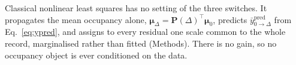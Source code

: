 \begin{appendixbox}
Classical nonlinear least squares has no setting of the three switches. It propagates the
mean occupancy alone, $\boldsymbol{\mu}_\Delta = \mathbf{P}(\Delta)^\top\boldsymbol{\mu}_0$, predicts
$\bar{y}^{\mathrm{pred}}_{0\to\Delta}$ from Eq.~\ref{eq:ypred}, and assigns to every residual one
scale common to the whole record, marginalised rather than fitted (Methods). There is no gain, so
no occupancy object is ever conditioned on the data.

\end{appendixbox}
